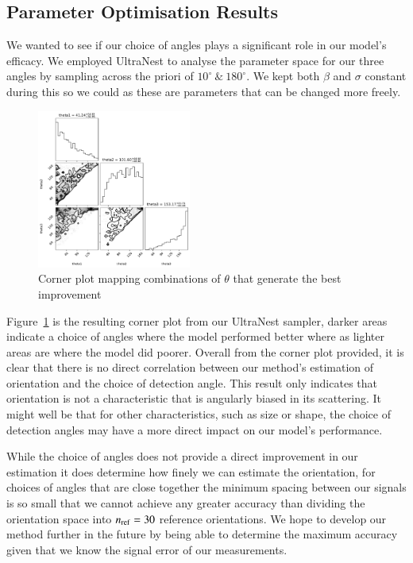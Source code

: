 \documentclass[final, 3p]{elsarticle}
\begin{document}
\subsection{Parameter Optimisation Results}
\label{sec:ultranest_res}

We wanted to see if our choice of angles plays a significant role in our model's efficacy. We employed UltraNest to analyse the parameter space for our three angles by sampling across the priori of $10^{\circ} \ \& \ 180^{\circ}$.  We kept both $\beta$ and $\sigma$ constant during this so we could as these are parameters that can be changed more freely.

\begin{figure}[h]
	\centering
	\includegraphics[width=0.45\textwidth]{./Images/fig7.png}
	\caption{Corner plot mapping combinations of $\theta$ that generate the best improvement}
	\label{fig:corner}
\end{figure}

Figure~\ref{fig:corner} is the resulting corner plot from our UltraNest sampler, darker areas indicate a choice of angles where the model performed better where as lighter areas are where the model did poorer. Overall from the corner plot provided, it is clear that there is no direct correlation between our method's estimation of orientation and the choice of detection angle. This result only indicates that orientation is not a characteristic that is angularly biased in its scattering. It might well be that for other characteristics, such as size or shape, the choice of detection angles may have a more direct impact on our model's performance. 

While the choice of angles does not provide a direct improvement in our estimation it does determine how finely we can estimate the orientation, for choices of angles that are close together the minimum spacing between our signals is so small that we cannot achieve any greater accuracy than dividing the orientation space into $n_{\rm ref}=30$ reference orientations.  We hope to develop our method further in the future by being able to determine the maximum accuracy given that we know the signal error of our measurements. 
\end{document}
